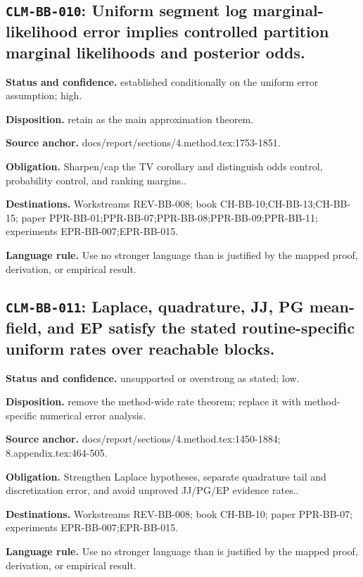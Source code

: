 \subsection[\texttt{CLM-BB-010}]{\texttt{CLM-BB-010}: Uniform segment log marginal-likelihood error implies controlled partition marginal likelihoods and posterior odds.}
\textbf{Status and confidence.} established conditionally on the uniform error assumption; high.\par
\textbf{Disposition.} retain as the main approximation theorem.\par
\textbf{Source anchor.} docs/report/sections/4.method.tex:1753-1851.\par
\textbf{Obligation.} Sharpen/cap the TV corollary and distinguish odds control, probability control, and ranking margins..\par
\textbf{Destinations.} Workstreams REV-BB-008; book CH-BB-10;CH-BB-13;CH-BB-15; paper PPR-BB-01;PPR-BB-07;PPR-BB-08;PPR-BB-09;PPR-BB-11; experiments EPR-BB-007;EPR-BB-015.\par
\textbf{Language rule.} Use no stronger language than is justified by the mapped proof, derivation, or empirical result.

\subsection[\texttt{CLM-BB-011}]{\texttt{CLM-BB-011}: Laplace, quadrature, JJ, PG mean-field, and EP satisfy the stated routine-specific uniform rates over reachable blocks.}
\textbf{Status and confidence.} unsupported or overstrong as stated; low.\par
\textbf{Disposition.} remove the method-wide rate theorem; replace it with method-specific numerical error analysis.\par
\textbf{Source anchor.} docs/report/sections/4.method.tex:1450-1884; 8.appendix.tex:464-505.\par
\textbf{Obligation.} Strengthen Laplace hypotheses, separate quadrature tail and discretization error, and avoid unproved JJ/PG/EP evidence rates..\par
\textbf{Destinations.} Workstreams REV-BB-008; book CH-BB-10; paper PPR-BB-07; experiments EPR-BB-007;EPR-BB-015.\par
\textbf{Language rule.} Use no stronger language than is justified by the mapped proof, derivation, or empirical result.

